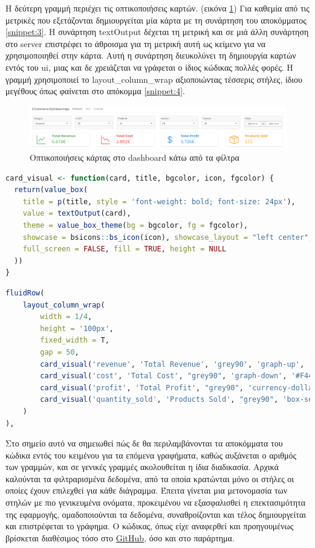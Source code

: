 \documentclass[greek, 12pt]{article}
\begin{document}
Η δεύτερη γραμμή περιέχει τις οπτικοποιήσεις καρτών. (εικόνα \ref{fig:8}) Για καθεμία από τις μετρικές που εξετάζονται δημιουργείται μία κάρτα με τη συνάρτηση του αποκόμματος \ref{snippet:3}. Η συνάρτηση textOutput δέχεται τη μετρική και σε μιά άλλη συνάρτηση στο server επιστρέφει το άθροισμα για τη μετρική αυτή ως κείμενο για να χρησιμοποιηθεί στην κάρτα. Αυτή η συνάρτηση διευκολύνει τη δημιουργία καρτών εντός του ui, μιας και δε χρειάζεται να γράφεται ο ίδιος κώδικας πολλές φορές. Η γραμμή χρησιμοποιεί το layout\_column\_wrap αξιοποιώντας τέσσερις στήλες, ίδιου μεγέθους όπως φαίνεται στο απόκομμα \ref{snippet:4}.

\begin{figure}[h]
    \centering
    \includegraphics[width=\textwidth]{pictures/8_card_visuals.png}
    \caption{Οπτικοποιήσεις κάρτας στο dashboard κάτω από τα φίλτρα}
    \label{fig:8}
\end{figure}

\begin{lstlisting}[language=R, caption=Φιλτράρισμα δεδομένων, label={snippet:3}]
card_visual <- function(card, title, bgcolor, icon, fgcolor) {
  return(value_box(
    title = p(title, style = 'font-weight: bold; font-size: 24px'), 
    value = textOutput(card),
    theme = value_box_theme(bg = bgcolor, fg = fgcolor),
    showcase = bsicons::bs_icon(icon), showcase_layout = "left center",
    full_screen = FALSE, fill = TRUE, height = NULL
  ))
}
\end{lstlisting}

\begin{lstlisting}[language=R, caption=Φιλτράρισμα δεδομένων, label={snippet:4}]
fluidRow(
    layout_column_wrap(
        width = 1/4,
        height = '100px',
        fixed_width = T,
        gap = 50,
        card_visual('revenue', 'Total Revenue', 'grey90', 'graph-up', '#4CAF50'),
        card_visual('cost', 'Total Cost', "grey90", 'graph-down', '#F44336'),
        card_visual('profit', 'Total Profit', "grey90", 'currency-dollar', '#2196F3'),
        card_visual('quantity_sold', 'Products Sold', "grey90", 'box-seam', '#FF9800')
    )
),
\end{lstlisting}

Στο σημείο αυτό να σημειωθεί πώς δε θα περιλαμβάνονται τα αποκόμματα του κώδικα εντός του κειμένου για τα επόμενα γραφήματα, καθώς αυξάνεται ο αριθμός των γραμμών, και σε γενικές γραμμές ακολουθείται η ίδια διαδικασία. Αρχικά καλούνται τα φιλτραρισμένα δεδομένα, από τα οποία κρατώνται μόνο οι στήλες οι οποίες έχουν επιλεχθεί για κάθε διάγραμμα. Έπειτα γίνεται μια μετονομασία των στηλών με πιο γενικευμένα ονόματα, προκειμένου να εξασφαλισθεί η επεκτασιμότητα της εφαρμογής, ομαδοποιούνται τα δεδομένα, συναθροίζονται και τέλος δημιουργείται και επιστρέφεται το γράφημα. Ο κώδικας, όπως είχε αναφερθεί και προηγουμένως βρίσκεται διαθέσιμος τόσο στο \href{https://github.com/kostas-rigan/r-shiny-dashboard-app}{GitHub}, όσο και στο παράρτημα.
\end{document}
